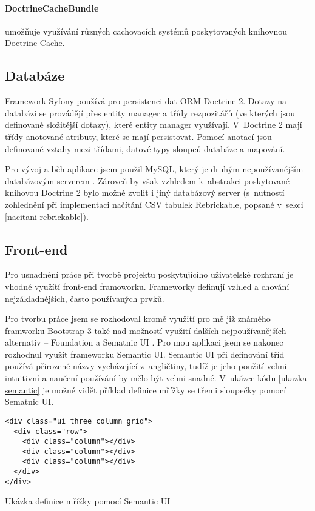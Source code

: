     \paragraph{DoctrineCacheBundle} 
    umožňuje využívání různých cachovacích systémů poskytovaných knihovnou Doctrine Cache. \autocite{doctrinecache}

\subsection{Databáze}
Framework Syfony používá pro persistenci dat \gls{ORM} Doctrine 2. Dotazy na databázi se provádějí přes entity manager a třídy
rezpozitářů (ve kterých jsou definované složitější dotazy), které entity manager využívají. V~Doctrine 2 mají třídy anotované atributy, které se mají persistovat. Pomocí anotací jsou definované vztahy mezi třídami, datové typy sloupců databáze a mapování.

Pro vývoj a běh aplikace jsem použil MySQL, který je druhým nepoužívanějším databázovým serverem \autocite{database-servers}. Zároveň by však vzhledem k~abstrakci poskytované knihovou Doctrine 2 bylo možné zvolit i jiný databázový server (s~nutností zohlednění při implementaci načítání CSV tabulek Rebrickable, popsané v~sekci \ref{nacitani-rebrickable}).

\subsection{Front-end}
Pro usnadnění práce při tvorbě projektu poskytujícího uživatelské rozhraní je vhodné využítí front-end framoworku. Frameworky definují vzhled a chování nejzákladnějších, často používaných prvků. 

Pro tvorbu práce jsem se rozhodoval kromě využití pro mě již známého framworku Bootstrap 3 také nad možností využití dalších nejpoužívanějších alternativ – Foundation a Sematnic UI \autocite{web:frameworks}. Pro mou aplikaci jsem se nakonec rozhodnul využít frameworku Semantic UI. Semantic UI při definování tříd používá přirozené názvy vycházející z~angličtiny, tudíž je jeho použití velmi intuitivní a naučení používání by mělo být velmi snadné. V~ukázce kódu \ref{ukazka-semantic} je možné vidět příklad definice mřížky se třemi sloupečky pomocí Sematnic UI.

\begin{listing}[htbp]
  \begin{verbatim}
<div class="ui three column grid">
  <div class="row">
    <div class="column"></div>
    <div class="column"></div>
    <div class="column"></div>
  </div>
</div>
    \end{verbatim}
  \caption{Ukázka definice mřížky pomocí Semantic UI\label{ukazka-semantic}}
\end{listing}

\subsubsection{}